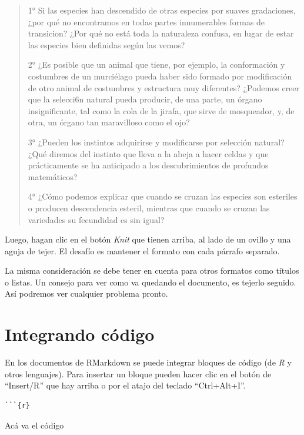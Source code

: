 \documentclass[]{book}
\newenvironment{Shaded}{\begin{snugshade}}{\end{snugshade}}
\newcommand{\NormalTok}[1]{#1}
\theoremstyle{definition}
\theoremstyle{definition}
\theoremstyle{definition}
\theoremstyle{remark}
\begin{document}
\begin{quote}
1° Si las especies han descendido de otras especies por suaves
gradaciones, ¿por qué no encontramos en todas partes innumerables formas
de transicion? ¿Por qué no está toda la naturaleza confusa, en lugar de
estar las especies bien definidas según las vemos?

2° ¿Es posible que un animal que tiene, por ejemplo, la conformación y
costumbres de un murciélago pueda haber sido formado por modificación de
otro animal de costumbres y estructura muy diferentes? ¿Podemos creer
que la selecci6n natural pueda producir, de una parte, un órgano
insignificante, tal como la cola de la jirafa, que sirve de mosqueador,
y, de otra, un órgano tan maravilloso como el ojo?

3° ¿Pueden los instintos adquirirse y modificarse por selección natural?
¿Qué diremos del instinto que lleva a la abeja a hacer celdas y que
prácticamente se ha anticipado a los descubrimientos de profundos
matemáticos?

4° ¿Cómo podemos explicar que cuando se cruzan las especies son
esteriles o producen descendencia esteril, mientras que cuando se cruzan
las variedades su fecundidad es sin igual?
\end{quote}

Luego, hagan clic en el botón \emph{Knit} que tienen arriba, al lado de
un ovillo y una aguja de tejer. El desafío es mantener el formato con
cada párrafo separado.

La misma consideración se debe tener en cuenta para otros formatos como
títulos o listas. Un consejo para ver como va quedando el documento, es
tejerlo seguido. Así podremos ver cualquier problema pronto.

\hypertarget{integrando-codigo}{%
\section{Integrando código}\label{integrando-codigo}}

En los documentos de RMarkdown se puede integrar bloques de código (de
\emph{R} y otros lenguajes). Para insertar un bloque pueden hacer clic
en el botón de ``Insert/R'' que hay arriba o por el atajo del teclado
``Ctrl+Alt+I''.

\begin{verbatim}
```{r}
\end{verbatim}

\begin{Shaded}
\begin{Highlighting}[]
\NormalTok{Acá va el código}
\end{Highlighting}
\end{Shaded}
\end{document}
